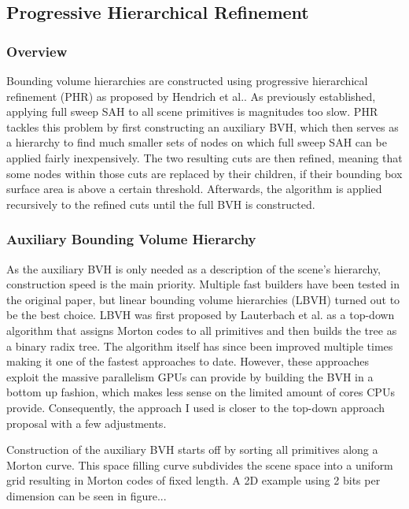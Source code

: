 \subsection{Progressive Hierarchical Refinement}
\subsubsection{Overview}
Bounding volume hierarchies are constructed using progressive hierarchical refinement (PHR) as proposed by Hendrich et al.\cite{hendrich_parallel_2017}. As previously established, applying full sweep SAH to all scene primitives is magnitudes too slow. PHR tackles this problem by first constructing an auxiliary BVH, which then serves as a hierarchy to find much smaller sets of nodes on which full sweep SAH can be applied fairly inexpensively. The two resulting cuts are then refined, meaning that some nodes within those cuts are replaced by their children, if their bounding box surface area is above a certain threshold. Afterwards, the algorithm is applied recursively to the refined cuts until the full BVH is constructed. 

\subsubsection{Auxiliary Bounding Volume Hierarchy}
As the auxiliary BVH is only needed as a description of the scene's hierarchy, construction speed is the main priority. Multiple fast builders have been tested in the original paper\cite{hendrich_parallel_2017}, but linear bounding volume hierarchies (LBVH) turned out to be the best choice. LBVH was first proposed by Lauterbach et al.\cite{lauterbach09lbvh} as a top-down algorithm that assigns Morton codes to all primitives and then builds the tree as a binary radix tree. The algorithm itself has since been improved multiple times\cite{karras12lbvh,apetrei14lbvh,chitalu20lbvh} making it one of the fastest approaches to date\cite{meister21survey}. However, these approaches exploit the massive parallelism GPUs can provide by building the BVH in a bottom up fashion, which makes less sense on the limited amount of cores CPUs provide. Consequently, the approach I used is closer to the top-down approach proposal\cite{lauterbach09lbvh} with a few adjustments. 

Construction of the auxiliary BVH starts off by sorting all primitives along a Morton curve\cite{morton66curve}. This space filling curve subdivides the scene space into a uniform grid resulting in Morton codes of fixed length. A 2D example using 2 bits per dimension can be seen in figure...%


